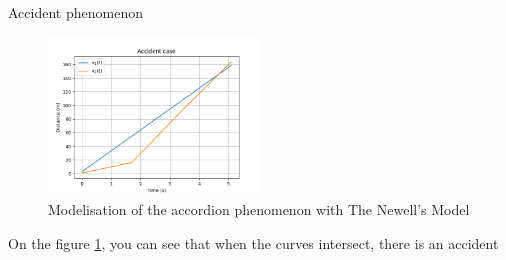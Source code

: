 \documentclass{beamer}
\begin{document}
\begin{frame}{Accident phenomenon}
    \begin{figure}
    	\includegraphics[width=0.5\textwidth]{1W2_Acc2.png}
    	\caption{Modelisation of the accordion phenomenon with The Newell's Model}
    	\label{fig:ACC}
    \end{figure}
    \begin{block}{}
    	On the figure \ref{fig:ACC}, you can see that when the curves intersect, there is an accident
    \end{block}
\end{frame}
\end{document}
